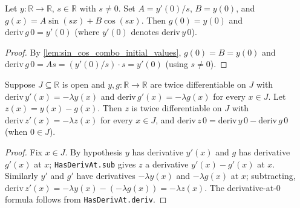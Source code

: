\begin{lemma}[Initial data of $g$ when $A = y'(0)/s$, $B = y(0)$]
    \label{lem:g_match_initial_data}
    \leanok
    Let $y : \mathbb{R} \to \mathbb{R}$, $s \in \mathbb{R}$ with $s \neq 0$. Set
    $A = y'(0)/s$, $B = y(0)$, and $g(x) = A \sin(sx) + B \cos(sx)$. Then
    $g(0) = y(0)$ and $\mathrm{deriv}\, g\, 0 = y'(0)$ (where $y'(0)$ denotes
    $\mathrm{deriv}\, y\, 0$).
\end{lemma}
\begin{proof}
    By \cref{lem:sin_cos_combo_initial_values}, $g(0) = B = y(0)$ and
    $\mathrm{deriv}\, g\, 0 = A s = (y'(0)/s) \cdot s = y'(0)$ (using
    $s \neq 0$).
\end{proof}

\begin{lemma}
    \label{lem:diff_of_two_ode_solutions}
    \leanok
    Suppose $J \subseteq \mathbb{R}$ is open and $y, g : \mathbb{R} \to \mathbb{R}$
    are twice differentiable on $J$ with $\mathrm{deriv}\, y'(x) = -\lambda y(x)$
    and $\mathrm{deriv}\, g'(x) = -\lambda g(x)$ for every $x \in J$. Let
    $z(x) = y(x) - g(x)$. Then $z$ is twice differentiable on $J$ with
    $\mathrm{deriv}\, z'(x) = -\lambda z(x)$ for every $x \in J$, and
    $\mathrm{deriv}\, z\, 0 = \mathrm{deriv}\, y\, 0 - \mathrm{deriv}\, g\, 0$
    (when $0 \in J$).
\end{lemma}
\begin{proof}
    Fix $x \in J$. By hypothesis $y$ has derivative $y'(x)$ and $g$ has
    derivative $g'(x)$ at $x$; \texttt{HasDerivAt.sub} gives $z$ a derivative
    $y'(x) - g'(x)$ at $x$. Similarly $y'$ and $g'$ have derivatives
    $-\lambda y(x)$ and $-\lambda g(x)$ at $x$; subtracting,
    $\mathrm{deriv}\, z'(x) = -\lambda y(x) - (-\lambda g(x)) = -\lambda z(x)$.
    The derivative-at-$0$ formula follows from \texttt{HasDerivAt.deriv}.
\end{proof}

